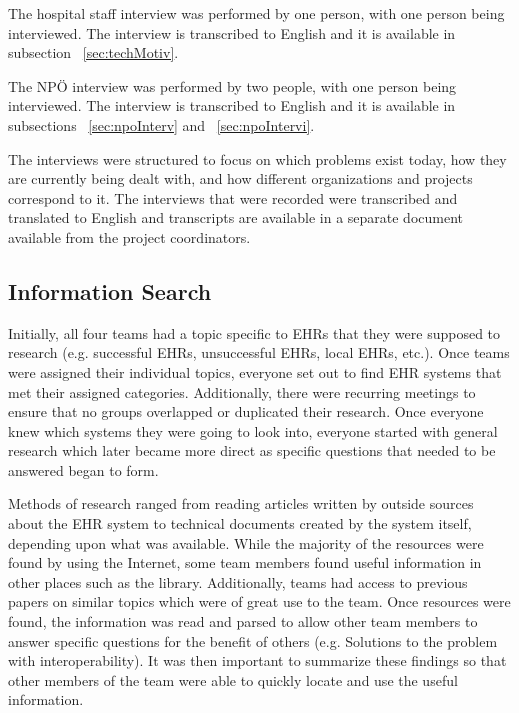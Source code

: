 \documentclass[14pt]{article}
\begin{document}
The hospital staff interview \cite{FarzinYazdi} was performed by one person, with one person being interviewed. The interview is transcribed to English and it is available in subsection ~\ref{sec:techMotiv}. 

The NPÖ interview \cite{ViktorJernelov} was performed by two people, with one person being interviewed. The interview is transcribed to English and it is available in subsections ~\ref{sec:npoInterv} and ~\ref{sec:npoIntervi}. 

The interviews were structured to focus on which problems exist today, how they are currently being dealt with, and how different organizations and projects correspond to it. The interviews that were recorded were transcribed and translated to English and transcripts are available in a separate document available from the project coordinators.

\subsection{Information Search}
Initially, all four teams had a topic specific to \glspl{EHR} that they were supposed to research (e.g. successful \glspl{EHR}, unsuccessful \glspl{EHR}, local \glspl{EHR}, etc.). Once teams were assigned their individual topics, everyone set out to find \gls{EHR} systems that met their assigned categories. Additionally, there were recurring meetings to ensure that no groups overlapped or duplicated their research. Once everyone knew which systems they were going to look into, everyone started with general research which later became more direct as specific questions that needed to be answered began to form.

Methods of research ranged from reading articles written by outside sources about the \gls{EHR} system to technical documents created by the system itself, depending upon what was available.  While the majority of the resources were found by using the Internet, some team members found useful information in other places such as the library.  Additionally, teams had access to previous papers on similar topics which were of great use to the team.  Once resources were found, the information was read and parsed to allow other team members to answer specific questions for the benefit of others (e.g. Solutions to the problem with interoperability).  It was then important to summarize these findings so that other members of the team were able to quickly locate and use the useful information.

\newpage
\end{document}
